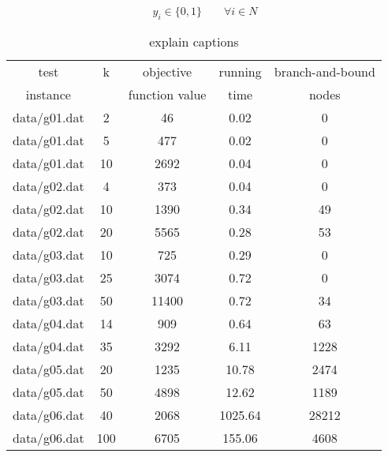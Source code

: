 \begin{equation}
  y_i \in \{0,1\} \qquad \forall i \in N
\end{equation}


\begin{table} 
\small
\centering
\begin{tabular}{ccccc}
\hline
test     & k & objective      & running & branch-and-bound \\
instance &   & function value & time    & nodes \\
\hline
data/g01.dat		&2	&46	&0.02	&0	\\ 
data/g01.dat		&5	&477	&0.02	&0	\\ 
data/g01.dat		&10	&2692	&0.04	&0	\\ 
data/g02.dat		&4	&373	&0.04	&0	\\ 
data/g02.dat		&10	&1390	&0.34	&49	\\ 
data/g02.dat		&20	&5565	&0.28	&53	\\ 
data/g03.dat		&10	&725	&0.29	&0	\\ 
data/g03.dat		&25	&3074	&0.72	&0	\\ 
data/g03.dat		&50	&11400	&0.72	&34	\\ 
data/g04.dat		&14	&909	&0.64	&63	\\ 
data/g04.dat		&35	&3292	&6.11	&1228	\\ 
data/g05.dat		&20	&1235	&10.78	&2474	\\ 
data/g05.dat		&50	&4898	&12.62	&1189	\\ 
data/g06.dat		&40	&2068	&1025.64	&28212	\\ 
data/g06.dat		&100	&6705	&155.06	&4608	\\

\hline
\end{tabular}
\caption{explain captions}
\label{tbl:scf_fast}
\end{table}
